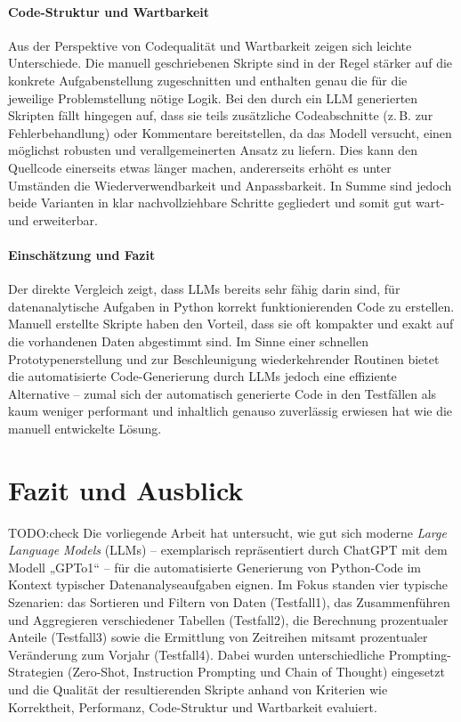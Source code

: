 \documentclass[11pt,a4paper]{article}
\begin{document}
\paragraph{Code-Struktur und Wartbarkeit}
Aus der Perspektive von Codequalität und Wartbarkeit zeigen sich leichte Unterschiede. Die manuell geschriebenen Skripte sind in der Regel stärker auf die konkrete Aufgabenstellung zugeschnitten und enthalten genau die für die jeweilige Problemstellung nötige Logik. Bei den durch ein LLM generierten Skripten fällt hingegen auf, dass sie teils zusätzliche Codeabschnitte (z.\,B. zur Fehlerbehandlung) oder Kommentare bereitstellen, da das Modell versucht, einen möglichst robusten und verallgemeinerten Ansatz zu liefern. Dies kann den Quellcode einerseits etwas länger machen, andererseits erhöht es unter Umständen die Wiederverwendbarkeit und Anpassbarkeit. In Summe sind jedoch beide Varianten in klar nachvollziehbare Schritte gegliedert und somit gut wart- und erweiterbar.

\paragraph{Einschätzung und Fazit}
Der direkte Vergleich zeigt, dass LLMs bereits sehr fähig darin sind, für datenanalytische Aufgaben in Python korrekt funktionierenden Code zu erstellen. Manuell erstellte Skripte haben den Vorteil, dass sie oft kompakter und exakt auf die vorhandenen Daten abgestimmt sind. Im Sinne einer schnellen Prototypenerstellung und zur Beschleunigung wiederkehrender Routinen bietet die automatisierte Code-Generierung durch LLMs jedoch eine effiziente Alternative -- zumal sich der automatisch generierte Code in den Testfällen als kaum weniger performant und inhaltlich genauso zuverlässig erwiesen hat wie die manuell entwickelte Lösung.

\section{Fazit und Ausblick}
\label{sec:fazit}
TODO:check
Die vorliegende Arbeit hat untersucht, wie gut sich moderne \emph{Large Language Models} (LLMs) – exemplarisch repräsentiert durch ChatGPT mit dem Modell „GPTo1“ – für die automatisierte Generierung von Python-Code im Kontext typischer Datenanalyseaufgaben eignen. Im Fokus standen vier typische Szenarien: das Sortieren und Filtern von Daten (Testfall1), das Zusammenführen und Aggregieren verschiedener Tabellen (Testfall2), die Berechnung prozentualer Anteile (Testfall3) sowie die Ermittlung von Zeitreihen mitsamt prozentualer Veränderung zum Vorjahr (Testfall4). Dabei wurden unterschiedliche Prompting-Strategien (Zero-Shot, Instruction Prompting und Chain of Thought) eingesetzt und die Qualität der resultierenden Skripte anhand von Kriterien wie Korrektheit, Performanz, Code-Struktur und Wartbarkeit evaluiert.
\end{document}
